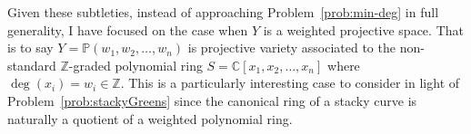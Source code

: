 \documentclass[11pt,reqno]{amsart}
\theoremstyle{remark}
\newtheorem{remark}[lemma]{Remark}
\newcommand{\C}{\mathbb{C}}
\renewcommand{\P}{\mathbb{P}}
\newcommand{\Z}{\mathbb{Z}}
\newcommand{\juliette}[1]{{\color{red} \sf $\spadesuit\spadesuit\spadesuit$ Juliette: [#1]}}
\begin{document}

%

Given these subtleties, instead of approaching Problem~\ref{prob:min-deg} in full generality, I have focused on the case when $Y$ is a weighted projective space. That is to say $Y=\P(w_{1},w_{2},\ldots,w_{n})$ is projective variety associated to the non-standard $\Z$-graded polynomial ring $S=\C[x_{1},x_{2},\ldots,x_{n}]$ where $\deg(x_{i})=w_{i}\in \Z$. This is a particularly interesting case to consider in light of Problem~\ref{prob:stackyGreens} since  the canonical ring of a stacky curve is naturally a quotient of a weighted polynomial ring. 
\end{document}
